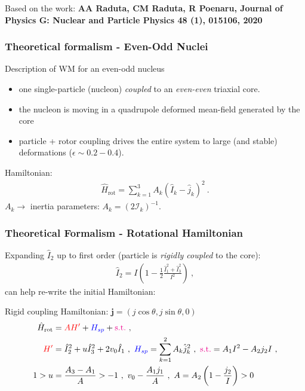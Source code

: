 \documentclass{beamer}
\begin{document}
\begin{frame}
  Based on the work: \textbf{AA Raduta, CM Raduta, R Poenaru, Journal of Physics G: Nuclear and Particle Physics 48 (1), 015106, 2020}
  \frametitle{Theoretical formalism - Even-Odd Nuclei}
  \begin{exampleblock}{Description of WM for an even-odd nucleus}
    \begin{itemize}
      \item one single-particle (nucleon) \emph{coupled} to an \emph{even-even} triaxial core.
      \item the nucleon is moving in a quadrupole deformed mean-field generated by the core
      \item particle + rotor coupling drives the entire system to large (and stable) deformations ($\epsilon\sim0.2-0.4$).
    \end{itemize}
  \end{exampleblock}
Hamiltonian:
\begin{align}
  \hat{H}_\text{rot}=\sum_{k=1}^3A_k\left(\hat{I}_k-\hat{j}_k\right)^2\ .
\end{align}
$A_k\rightarrow$ inertia parameters: $A_k=(2\mathcal{I}_k)^{-1}$.
\end{frame}

\begin{frame}
  \frametitle{Theoretical Formalism - Rotational Hamiltonian}

  Expanding $\hat{I}_2$ up to first order (particle is \emph{rigidly coupled} to the core):
  \begin{align}
    \hat{I}_2=I\left(1-\frac{1}{2}\frac{\hat{I}_1^2+\hat{I}_3^2}{I^2}\right)\ ,
  \end{align}
can help re-write the initial Hamiltonian: %
\begin{exampleblock}{Rigid coupling Hamiltonian: $\mathbf{j}=(j\cos\theta,j\sin\theta,0)$}
  \begin{align}
    \hat{H}_\text{rot}&={\color{red}AH'}+{\color{blue}H_{sp}}+{\color{magenta}\text{s.t.}}\ ,\\
    {\color{red}H'}&=\hat{I}_2^2+u\hat{I}_3^2+2v_0\hat{I}_1\ ,\ {\color{blue}H_{sp}}=\sum_{k=1}^2A_k\hat{j}_k^2\ ,\ {\color{magenta}\text{s.t.}}=A_1I^2-A_2j_2I\ ,\\
    1>u&=\frac{A_3-A_1}{A}>-1\ ,\ v_0-\frac{A_1j_1}{A}\ ,\ A=A_2\left(1-\frac{j_2}{I}\right)>0
  \end{align}
\end{exampleblock}
\end{frame}
\end{document}
